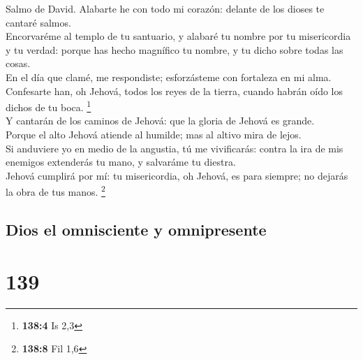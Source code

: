 Salmo de David. Alabarte he con todo mi corazón: delante de
los dioses te cantaré salmos.\\
 Encorvaréme al templo de tu santuario, y alabaré tu nombre
por tu misericordia y tu verdad: porque has hecho magnífico tu nombre, y
tu dicho sobre todas las cosas.\\
 En el día que clamé, me respondiste; esforzásteme con
fortaleza en mi alma.\\
 Confesarte han, oh Jehová, todos los reyes de la tierra,
cuando habrán oído los dichos de tu boca. \footnote{\textbf{138:4} Is
  2,3}\\
 Y cantarán de los caminos de Jehová: que la gloria de
Jehová es grande.\\
 Porque el alto Jehová atiende al humilde; mas al altivo
mira de lejos.\\
 Si anduviere yo en medio de la angustia, tú me vivificarás:
contra la ira de mis enemigos extenderás tu mano, y salvaráme tu
diestra.\\
 Jehová cumplirá por mí: tu misericordia, oh Jehová, es para
siempre; no dejarás la obra de tus manos. \footnote{\textbf{138:8} Fil
  1,6}

\hypertarget{dios-el-omnisciente-y-omnipresente}{%
\subsection{Dios el omnisciente y
omnipresente}\label{dios-el-omnisciente-y-omnipresente}}

\hypertarget{section-138}{%
\section{139}\label{section-138}}

